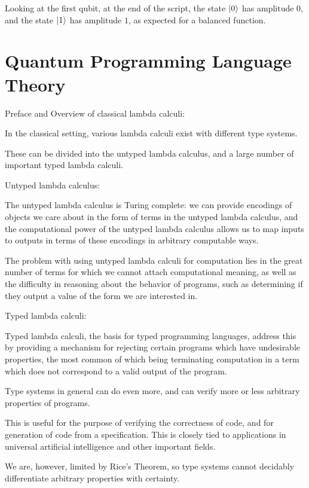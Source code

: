 \documentclass{article}
\theoremstyle{plain}
\theoremstyle{definition}
\theoremstyle{remark}
\begin{document}
Looking at the first qubit, at the end of the script, the state $\left|\mspace{0.5mu} 0 \mspace{0.5mu}\right\rangle$ has amplitude $0$,
and the state $\left|\mspace{0.5mu} 1 \mspace{0.5mu}\right\rangle$ has amplitude $1$, as expected for a balanced function.
\pagebreak

\section{Quantum Programming Language Theory}



$$$$
{\huge Preface and Overview of classical lambda calculi:}
$$$$


In the classical setting, various lambda calculi exist with different type systems.

These can be divided into the untyped lambda calculus, and a large number of important typed lambda calculi.

$$$$
{
\large Untyped lambda calculus:}
$$$$

The untyped lambda calculus is Turing complete: we can provide encodings of objects we care about in the form of terms in the untyped lambda calculus,
and the computational power of the untyped lambda calculus allows us to map inputs to outputs in terms of these encodings in arbitrary computable ways.

The problem with using untyped lambda calculi for computation lies in the great number of terms for which we cannot attach computational meaning, as well as the difficulty in reasoning about the behavior of programs, such as determining if they output a value of the form we are interested in.

$$$$
{
\large Typed lambda calculi:}
$$$$

Typed lambda calculi, the basis for typed programming languages, address this by providing a mechanism for rejecting certain programs which have undesirable properties, the most common of which being terminating computation in a term which does not correspond to a valid output of the program.

Type systems in general can do even more, and can verify more or less arbitrary properties of programs.

This is useful for the purpose of verifying the correctness of code, and for generation of code from a specification.
This is closely tied to applications in universal artificial intelligence and other important fields.

We are, however, limited by Rice's Theorem, so type systems cannot decidably differentiate arbitrary properties with certainty.
\end{document}
